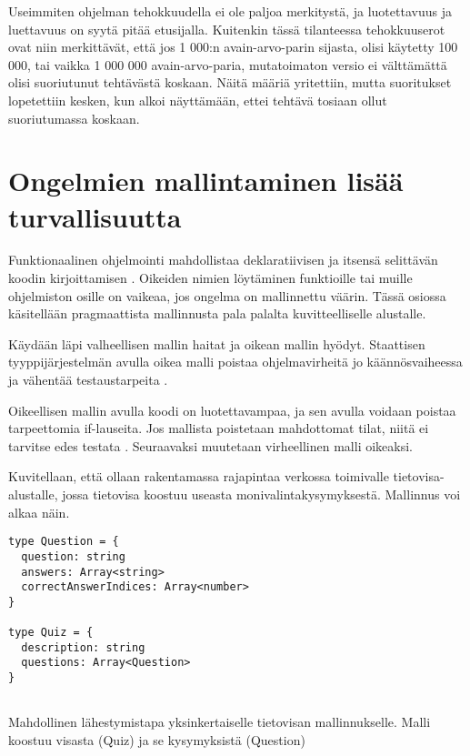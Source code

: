 Useimmiten ohjelman tehokkuudella ei ole paljoa merkitystä, ja luotettavuus ja luettavuus on syytä pitää etusijalla. Kuitenkin tässä tilanteessa tehokkuuserot ovat niin merkittävät, että jos 1 000:n avain-arvo-parin sijasta, olisi käytetty 100 000, tai vaikka 1 000 000 avain-arvo-paria, mutatoimaton versio ei välttämättä olisi suoriutunut tehtävästä koskaan. Näitä määriä yritettiin, mutta suoritukset lopetettiin kesken, kun alkoi näyttämään, ettei tehtävä tosiaan ollut suoriutumassa koskaan.

\section{Ongelmien mallintaminen lisää turvallisuutta}

Funktionaalinen ohjelmointi mahdollistaa deklaratiivisen ja itsensä selittävän koodin kirjoittamisen \cite{ms:fp_vs_imperative}. Oikeiden nimien löytäminen funktioille tai muille ohjelmiston osille on vaikeaa, jos ongelma on mallinnettu väärin. Tässä osiossa käsitellään pragmaattista mallinnusta pala palalta kuvitteelliselle alustalle.

Käydään läpi valheellisen mallin haitat ja oikean mallin hyödyt. Staattisen tyyppijärjestelmän avulla oikea malli poistaa ohjelmavirheitä jo käännösvaiheessa ja vähentää testaustarpeita \cite{impossiblebetter}.

Oikeellisen mallin avulla koodi on luotettavampaa, ja sen avulla voidaan poistaa tarpeettomia if-lauseita. Jos mallista poistetaan mahdottomat tilat, niitä ei tarvitse edes testata \cite{impossiblebetter}. Seuraavaksi muutetaan virheellinen malli oikeaksi.

Kuvitellaan, että ollaan rakentamassa rajapintaa verkossa toimivalle tietovisa-alustalle, jossa tietovisa koostuu useasta monivalintakysymyksestä. Mallinnus voi alkaa näin.

\begin{code}
    \begin{verbatim}
type Question = {
  question: string
  answers: Array<string>
  correctAnswerIndices: Array<number>
}

type Quiz = {
  description: string
  questions: Array<Question>
}
         
\end{verbatim}
    \caption{Mahdollinen lähestymistapa yksinkertaiselle tietovisan mallinnukselle. Malli koostuu visasta (Quiz) ja se kysymyksistä (Question)}
    \label{code:ts_first_quiz}
\end{code}

